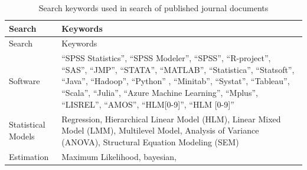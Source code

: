 \documentclass[english,man]{apa6}
\theoremstyle{definition}
\theoremstyle{definition}
\theoremstyle{definition}
\theoremstyle{remark}
\begin{document}
\begin{longtable}[]{@{}ll@{}}
\caption{\label{tab:searchwords} Search keywords used in search of published
journal documents}\tabularnewline
\toprule
\begin{minipage}[b]{0.21\columnwidth}\raggedright
Search\strut
\end{minipage} & \begin{minipage}[b]{0.38\columnwidth}\raggedright
Keywords\strut
\end{minipage}\tabularnewline
\midrule
\endfirsthead
\toprule
\begin{minipage}[b]{0.21\columnwidth}\raggedright
Search\strut
\end{minipage} & \begin{minipage}[b]{0.38\columnwidth}\raggedright
Keywords\strut
\end{minipage}\tabularnewline
\midrule
\endhead
\begin{minipage}[t]{0.21\columnwidth}\raggedright
Software\strut
\end{minipage} & \begin{minipage}[t]{0.38\columnwidth}\raggedright
\enquote{SPSS Statistics}, \enquote{SPSS Modeler}, \enquote{SPSS},
\enquote{R-project}, \enquote{SAS}, \enquote{JMP}, \enquote{STATA},
\enquote{MATLAB}, \enquote{Statistica}, \enquote{Statsoft},
\enquote{Java}, \enquote{Hadoop}, \enquote{Python} , \enquote{Minitab},
\enquote{Systat}, \enquote{Tableau}, \enquote{Scala}, \enquote{Julia},
\enquote{Azure Machine Learning}, \enquote{Mplus}, \enquote{LISREL},
\enquote{AMOS}, \enquote{HLM{[}0-9{]}}, \enquote{HLM {[}0-9{]}}\strut
\end{minipage}\tabularnewline
\begin{minipage}[t]{0.21\columnwidth}\raggedright
Statistical Models\strut
\end{minipage} & \begin{minipage}[t]{0.38\columnwidth}\raggedright
Regression, Hierarchical Linear Model (HLM), Linear Mixed Model (LMM),
Multilevel Model, Analysis of Variance (ANOVA), Structural Equation
Modeling (SEM)\strut
\end{minipage}\tabularnewline
\begin{minipage}[t]{0.21\columnwidth}\raggedright
Estimation\strut
\end{minipage} & \begin{minipage}[t]{0.38\columnwidth}\raggedright
Maximum Likelihood, bayesian,\strut
\end{minipage}\tabularnewline
\bottomrule
\end{longtable}
\end{document}
